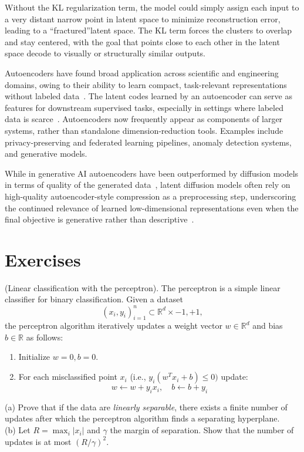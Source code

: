 Without the KL regularization term, the model could simply assign each input to a very distant narrow point in latent space to minimize reconstruction error, leading to a ``fractured''latent space. The KL term forces the clusters to overlap and stay centered, with the goal that
points close to each other in the latent space decode to visually or structurally similar outputs.



\bigskip



Autoencoders have found broad application across scientific and engineering domains, owing to their ability to learn compact, task-relevant representations without labeled data~\cite{balle2016end,vincent2010stacked,an2015variational,gomez2018automatic}.
The latent codes learned by an autoencoder can serve as features for downstream supervised tasks, especially in settings where labeled data is scarce~\cite{way2018extracting,broecker2025multimodal}.
Autoencoders now frequently appear as components of larger systems, rather than standalone dimension-reduction tools. Examples include privacy-preserving and federated learning pipelines, anomaly detection systems, and generative models. 

While in generative AI autoencoders have been outperformed by diffusion models in terms of quality of the generated data~\cite{song2020score,ho2020denoising}, 
latent diffusion models often rely on high-quality autoencoder-style compression as a preprocessing step, underscoring the continued relevance of learned low-dimensional representations even when the final objective is generative rather than descriptive~\cite{preechakul2022diffusion,rombach2022high}.




\section*{Exercises}


\begin{myexercise}(Linear classification with the perceptron). The perceptron is a simple linear classifier for binary classification. Given a dataset
$$
{(x_i, y_i)}_{i=1}^n \subset \mathbb{R}^d \times {-1, +1},
$$
the perceptron algorithm iteratively updates a weight vector $w \in \mathbb{R}^d$ and bias $b \in \mathbb{R}$ as follows:
\begin{enumerate}
\item Initialize $w = 0, b = 0$.
\item For each misclassified point $x_i$ (i.e., $y_i(w^T x_i + b) \le 0)$ update:
$$   w \gets w + y_i x_i, \quad b \gets b + y_i $$
\end{enumerate}
(a) Prove that if the data are {\em linearly separable}, there exists a finite number of updates after which the perceptron algorithm finds a separating hyperplane.\\
(b) Let $R = \max_i |x_i|$ and $\gamma$ the margin of separation. Show that the number of updates is at most $(R/\gamma)^2$.
\end{myexercise}

